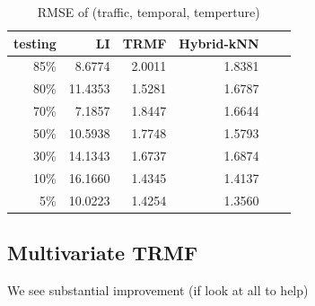 \begin{table} [htbp]
\centering
\caption{RMSE of (traffic, temporal, temperture)}
\label{table:traffic_temporal_tem}
\begin{tabular}{ r | r r r r r}
	testing	&LI	&TRMF	&Hybrid-kNN \\ \hline
	85\%	& 8.6774	&2.0011	&1.8381\\ 
	80\%	&11.4353	&1.5281	&1.6787\\
	70\%	& 7.1857	&1.8447	&1.6644\\
	50\%	&10.5938	&1.7748	&1.5793\\
	30\%	&14.1343	&1.6737	&1.6874\\
	10\%	&16.1660	&1.4345	&1.4137\\
	 5\%	&10.0223	&1.4254	&1.3560\\
\end{tabular}
\end{table}

\subsection{Multivariate TRMF}
We see substantial improvement (if look at all to help) 

